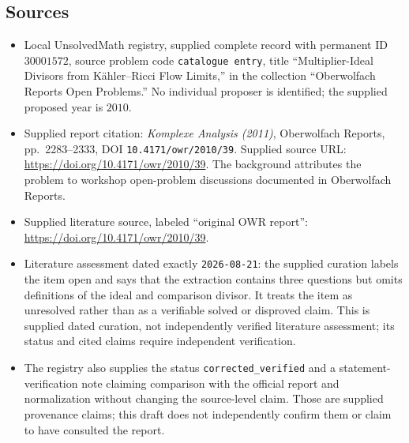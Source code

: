 \documentclass[11pt]{article}
\begin{document}
\subsection{Sources}
\begin{itemize}
\item Local UnsolvedMath registry, supplied complete record with permanent ID \(30001572\), source problem code \texttt{catalogue entry}, title ``Multiplier-Ideal Divisors from Kähler--Ricci Flow Limits,'' in the collection ``Oberwolfach Reports Open Problems.'' No individual proposer is identified; the supplied proposed year is \(2010\).
\item Supplied report citation: \emph{Komplexe Analysis (2011)}, Oberwolfach Reports, pp.\ 2283--2333, DOI \texttt{10.4171/owr/2010/39}. Supplied source URL: \url{https://doi.org/10.4171/owr/2010/39}. The background attributes the problem to workshop open-problem discussions documented in Oberwolfach Reports.
\item Supplied literature source, labeled ``original OWR report'': \url{https://doi.org/10.4171/owr/2010/39}.
\item Literature assessment dated exactly \texttt{2026-08-21}: the supplied curation labels the item open and says that the extraction contains three questions but omits definitions of the ideal and comparison divisor. It treats the item as unresolved rather than as a verifiable solved or disproved claim. This is supplied dated curation, not independently verified literature assessment; its status and cited claims require independent verification.
\item The registry also supplies the status \texttt{corrected\_verified} and a statement-verification note claiming comparison with the official report and normalization without changing the source-level claim. Those are supplied provenance claims; this draft does not independently confirm them or claim to have consulted the report.
\end{itemize}
\end{document}
